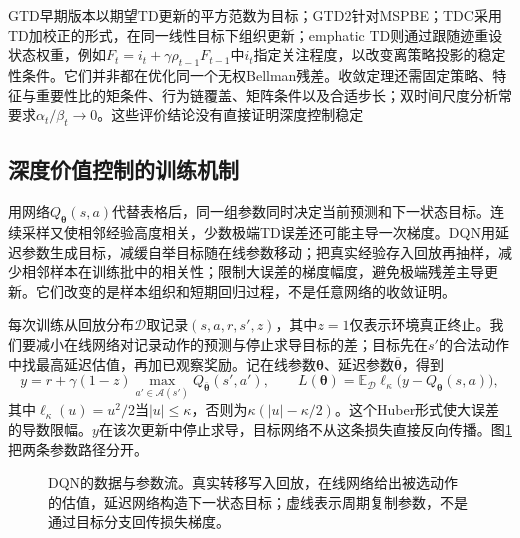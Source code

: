 GTD早期版本以期望TD更新的平方范数为目标；GTD2针对MSPBE；TDC采用TD加校正的形式，在同一线性目标下组织更新；emphatic TD则通过跟随迹重设状态权重，例如$F_t=i_t+\gamma\rho_{t-1}F_{t-1}$中$i_t$指定关注程度，以改变离策略投影的稳定性条件。它们并非都在优化同一个无权Bellman残差。收敛定理还需固定策略、特征与重要性比的矩条件、行为链覆盖、矩阵条件以及合适步长；双时间尺度分析常要求$\alpha_t/\beta_t\to0$。这些评价结论没有直接证明深度控制稳定

\subsection{深度价值控制的训练机制}
\label{sec:rl-learning-dqn}

用网络$Q_{\bm\theta}(s,a)$代替表格后，同一组参数同时决定当前预测和下一状态目标。连续采样又使相邻经验高度相关，少数极端TD误差还可能主导一次梯度。DQN用延迟参数生成目标，减缓自举目标随在线参数移动；把真实经验存入回放再抽样，减少相邻样本在训练批中的相关性；限制大误差的梯度幅度，避免极端残差主导更新。它们改变的是样本组织和短期回归过程，不是任意网络的收敛证明。

每次训练从回放分布$\mathcal D$取记录$(s,a,r,s',z)$，其中$z=1$仅表示环境真正终止。我们要减小在线网络对记录动作的预测与停止求导目标的差；目标先在$s'$的合法动作中找最高延迟估值，再加已观察奖励。记在线参数$\bm\theta$、延迟参数$\bar{\bm\theta}$，得到
\begin{equation}
  y=r+\gamma(1-z)\max_{a'\in\mathcal A(s')}Q_{\bar{\bm\theta}}(s',a'),
  \qquad
  L(\bm\theta)=\mathbb E_{\mathcal D}
       \ell_\kappa\bigl(y-Q_{\bm\theta}(s,a)\bigr),
  \label{eq:rl-learning-dqn-loss}
\end{equation}
其中$\ell_\kappa(u)=u^2/2$当$|u|\leq\kappa$，否则为$\kappa(|u|-\kappa/2)$。这个Huber形式使大误差的导数限幅。$y$在该次更新中停止求导，目标网络不从这条损失直接反向传播。图\ref{fig:rl-learning-dqn}把两条参数路径分开。

\begin{figure}[t]
  \centering
  
  \caption{DQN的数据与参数流。真实转移写入回放，在线网络给出被选动作的估值，延迟网络构造下一状态目标；虚线表示周期复制参数，不是通过目标分支回传损失梯度。}
  \label{fig:rl-learning-dqn}
\end{figure}

